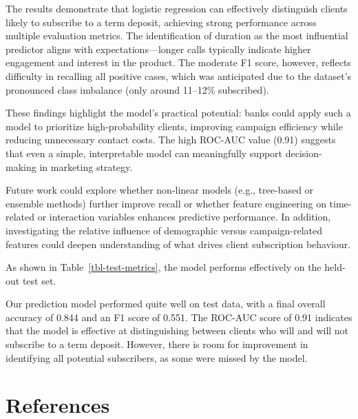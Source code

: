 \documentclass[
  letterpaper,
  DIV=11,
  numbers=noendperiod]{scrartcl}
\begin{document}
The results demonstrate that logistic regression can effectively
distinguish clients likely to subscribe to a term deposit, achieving
strong performance across multiple evaluation metrics. The
identification of duration as the most influential predictor aligns with
expectations---longer calls typically indicate higher engagement and
interest in the product. The moderate F1 score, however, reflects
difficulty in recalling all positive cases, which was anticipated due to
the dataset's pronounced class imbalance (only around 11--12\%
subscribed).

These findings highlight the model's practical potential: banks could
apply such a model to prioritize high-probability clients, improving
campaign efficiency while reducing unnecessary contact costs. The high
ROC-AUC value (0.91) suggests that even a simple, interpretable model
can meaningfully support decision-making in marketing strategy.

Future work could explore whether non-linear models (e.g., tree-based or
ensemble methods) further improve recall or whether feature engineering
on time-related or interaction variables enhances predictive
performance. In addition, investigating the relative influence of
demographic versus campaign-related features could deepen understanding
of what drives client subscription behaviour.

As shown in Table~\ref{tbl-test-metrics}, the model performs effectively
on the held-out test set.

Our prediction model performed quite well on test data, with a final
overall accuracy of 0.844 and an F1 score of 0.551. The ROC-AUC score of
0.91 indicates that the model is effective at distinguishing between
clients who will and will not subscribe to a term deposit. However,
there is room for improvement in identifying all potential subscribers,
as some were missed by the model.

\section*{References}\label{references}
\end{document}
